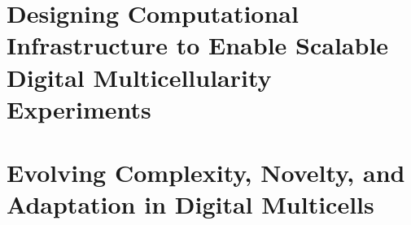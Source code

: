 

\part{Designing Computational Infrastructure to Enable Scalable Digital Multicellularity Experiments} \label{part:infrastructure}



\part{Evolving Complexity, Novelty, and Adaptation in Digital Multicells} \label{part:experiments}




